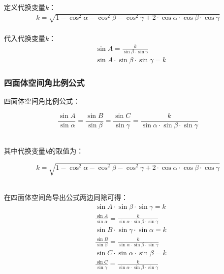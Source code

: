 \documentclass[UTF8]{ctexart}
\begin{document}
\newpage

    定义代换变量$k$：
    \begin{align}
        k=\sqrt{1-\cos^2{\alpha}-\cos^2{\beta}-\cos^2{\gamma}+2\cdot\cos{\alpha}\cdot\cos{\beta}\cdot\cos{\gamma}}
    \end{align}\\
    代入代换变量$k$：
    \begin{align}
        &\sin{A}=\frac{k}{\sin{\beta}\cdot\sin{\gamma}}\\[3mm]
        &\sin{A}\cdot\sin{\beta}\cdot\sin{\gamma}=k
    \end{align}\vspace{5pt}

\subsubsection{四面体空间角比例公式}
    四面体空间角比例公式：
    \begin{large}
        \begin{equation*}
            \frac{\sin{A}}{\sin{\alpha}}=\frac{\sin{B}}{\sin{\beta}}=\frac{\sin{C}}{\sin{\gamma}}=\frac{k}{\sin{\alpha}\cdot\sin{\beta}\cdot\sin{\gamma}}
        \end{equation*}
    \end{large}\\
    其中代换变量$k$的取值为：\vspace{5pt}
    \begin{large}
        \begin{equation*}
            k=\sqrt{1-\cos^2{\alpha}-\cos^2{\beta}-\cos^2{\gamma}+2\cdot\cos{\alpha}\cdot\cos{\beta}\cdot\cos{\gamma}}
        \end{equation*}
    \end{large}\\
    在四面体空间角导出公式两边同除可得：\vspace{5pt}
    \setcounter{equation}{0}
    \begin{align}
        &\sin{A}\cdot\sin{\beta}\cdot\sin{\gamma}=k\\[3mm]
        &\frac{\sin{A}}{\sin{\alpha}}=\frac{k}{\sin{\alpha}\cdot\sin{\beta}\cdot\sin{\gamma}}\\[8mm]
        &\sin{B}\cdot\sin{\gamma}\cdot\sin{\alpha}=k\\[3mm]
        &\frac{\sin{B}}{\sin{\beta}}=\frac{k}{\sin{\alpha}\cdot\sin{\beta}\cdot\sin{\gamma}}\\[8mm]
        &\sin{C}\cdot\sin{\alpha}\cdot\sin{\beta}=k\\[3mm]
        &\frac{\sin{C}}{\sin{\gamma}}=\frac{k}{\sin{\alpha}\cdot\sin{\beta}\cdot\sin{\gamma}}
    \end{align}
\end{document}
